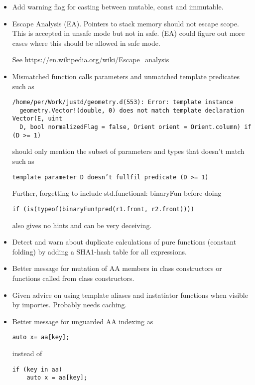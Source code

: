 \documentclass[xcolor=dvipsnames, twocolumn]{article}
\begin{document}
\begin{itemize}

\item Add warning flag for casting between mutable, const and immutable.

\item Escape Analysis (EA). Pointers to stack memory should not escape scope. This is
  accepted in unsafe mode but not in safe. (EA) could figure out more
  cases where this should be allowed in safe mode.

See https://en.wikipedia.org/wiki/Escape_analysis

\item Mismatched function calls parameters and unmatched template predicates such as

\begin{lstlisting}[frame=single]
/home/per/Work/justd/geometry.d(553): Error: template instance
  geometry.Vector!(double, 0) does not match template declaration Vector(E, uint
  D, bool normalizedFlag = false, Orient orient = Orient.column) if (D >= 1)
\end{lstlisting}

should only mention the subset of parameters and types that doesn't match such as

\begin{lstlisting}[frame=single]
template parameter D doesn’t fullfil predicate (D >= 1)
\end{lstlisting}

Further, forgetting to include std.functional: binaryFun before doing
\begin{lstlisting}[frame=single]
if (is(typeof(binaryFun!pred(r1.front, r2.front))))
\end{lstlisting}
also gives no hints and can be very deceiving.

\item Detect and warn about duplicate calculations of pure functions (constant
  folding) by adding a SHA1-hash table for all expressions.
\item Better message for mutation of AA members in class constructors or
  functions called from class constructors.

\item Given advice on using template aliases and instatiator functions when
  visible by importes. Probably needs caching.

\item Better message for unguarded AA indexing as
\begin{lstlisting}[frame=single]
auto x= aa[key];
\end{lstlisting}
instead of
\begin{lstlisting}[frame=single]
if (key in aa)
    auto x = aa[key];
\end{lstlisting}


\end{itemize}
\end{document}
